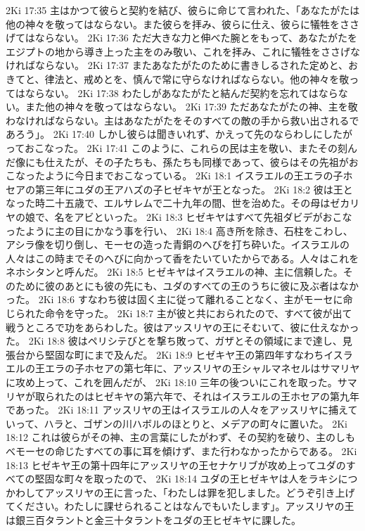 2Ki 17:35  主はかつて彼らと契約を結び、彼らに命じて言われた、「あなたがたは他の神々を敬ってはならない。また彼らを拝み、彼らに仕え、彼らに犠牲をささげてはならない。
2Ki 17:36  ただ大きな力と伸べた腕とをもって、あなたがたをエジプトの地から導き上った主をのみ敬い、これを拝み、これに犠牲をささげなければならない。
2Ki 17:37  またあなたがたのために書きしるされた定めと、おきてと、律法と、戒めとを、慎んで常に守らなければならない。他の神々を敬ってはならない。
2Ki 17:38  わたしがあなたがたと結んだ契約を忘れてはならない。また他の神々を敬ってはならない。
2Ki 17:39  ただあなたがたの神、主を敬わなければならない。主はあなたがたをそのすべての敵の手から救い出されるであろう」。
2Ki 17:40  しかし彼らは聞きいれず、かえって先のならわしにしたがっておこなった。
2Ki 17:41  このように、これらの民は主を敬い、またその刻んだ像にも仕えたが、その子たちも、孫たちも同様であって、彼らはその先祖がおこなったように今日までおこなっている。
2Ki 18:1  イスラエルの王エラの子ホセアの第三年にユダの王アハズの子ヒゼキヤが王となった。
2Ki 18:2  彼は王となった時二十五歳で、エルサレムで二十九年の間、世を治めた。その母はゼカリヤの娘で、名をアビといった。
2Ki 18:3  ヒゼキヤはすべて先祖ダビデがおこなったように主の目にかなう事を行い、
2Ki 18:4  高き所を除き、石柱をこわし、アシラ像を切り倒し、モーセの造った青銅のへびを打ち砕いた。イスラエルの人々はこの時までそのへびに向かって香をたいていたからである。人々はこれをネホシタンと呼んだ。
2Ki 18:5  ヒゼキヤはイスラエルの神、主に信頼した。そのために彼のあとにも彼の先にも、ユダのすべての王のうちに彼に及ぶ者はなかった。
2Ki 18:6  すなわち彼は固く主に従って離れることなく、主がモーセに命じられた命令を守った。
2Ki 18:7  主が彼と共におられたので、すべて彼が出て戦うところで功をあらわした。彼はアッスリヤの王にそむいて、彼に仕えなかった。
2Ki 18:8  彼はペリシテびとを撃ち敗って、ガザとその領域にまで達し、見張台から堅固な町にまで及んだ。
2Ki 18:9  ヒゼキヤ王の第四年すなわちイスラエルの王エラの子ホセアの第七年に、アッスリヤの王シャルマネセルはサマリヤに攻め上って、これを囲んだが、
2Ki 18:10  三年の後ついにこれを取った。サマリヤが取られたのはヒゼキヤの第六年で、それはイスラエルの王ホセアの第九年であった。
2Ki 18:11  アッスリヤの王はイスラエルの人々をアッスリヤに捕えていって、ハラと、ゴザンの川ハボルのほとりと、メデアの町々に置いた。
2Ki 18:12  これは彼らがその神、主の言葉にしたがわず、その契約を破り、主のしもべモーセの命じたすべての事に耳を傾けず、また行わなかったからである。
2Ki 18:13  ヒゼキヤ王の第十四年にアッスリヤの王セナケリブが攻め上ってユダのすべての堅固な町々を取ったので、
2Ki 18:14  ユダの王ヒゼキヤは人をラキシにつかわしてアッスリヤの王に言った、「わたしは罪を犯しました。どうぞ引き上げてください。わたしに課せられることはなんでもいたします」。アッスリヤの王は銀三百タラントと金三十タラントをユダの王ヒゼキヤに課した。
